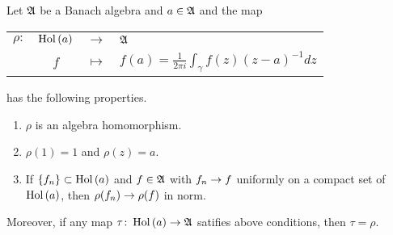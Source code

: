 \documentclass[a4paper,11pt]{report}
\begin{document}
\begin{thm}
	Let $\mathfrak{A}$ be a Banach algebra and $a \in \mathfrak{A}$ and the map
	\begin{center}
		\begin{tabular}{l c c l}
			$\rho \colon$ & $\operatorname{Hol}{(a)}$ & $\longrightarrow$ & $\mathfrak{A}$ \\
			~ & $f$ & $\longmapsto$ & $f(a)=\frac{1}{2 \pi i}\int_{\gamma} f(z) (z-a)^{-1} dz$
		\end{tabular}
	\end{center}
	has the following properties.
	\begin{enumerate}[label=\arabic*)]
		\item $\rho$ is an algebra homomorphism.
		\item $\rho(1) = 1$ and $\rho(z)=a$.
		\item If $\{f_n\} \subset \operatorname{Hol}{(a)}$ and $f \in \mathfrak{A}$ with $f_n \rightarrow f$ uniformly on a compact set of $\operatorname{Hol}{(a)}$, then $\rho(f_n) \rightarrow \rho(f)$ in norm.
	\end{enumerate}
	Moreover, if any map $\tau \colon \operatorname{Hol}{(a)} \rightarrow \mathfrak{A}$ satifies above conditions, then $\tau = \rho$. 
\end{thm}
\end{document}
